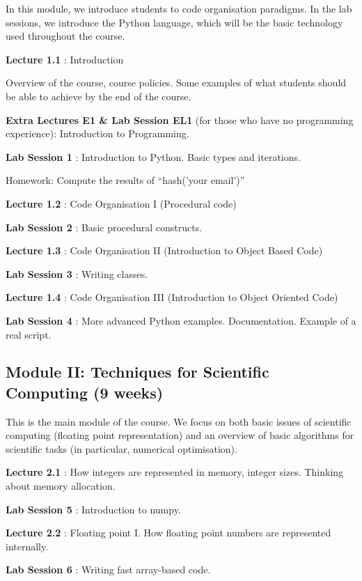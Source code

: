 \documentclass{article}
\newcommand*{\Lecture}[1]{%
{\bf #1}%
}
\begin{document}
In this module, we introduce students to code organisation paradigms. In the lab sessions, we introduce the Python language, which will be the basic technology used throughout the course.

\Lecture{Lecture 1.1}: Introduction

Overview of the course, course policies. Some examples of what students should be able to achieve by the end of the course.

\Lecture{Extra Lectures E1 \& Lab Session EL1} (for those who have no programming experience): Introduction to Programming.

\Lecture{Lab Session 1}: Introduction to Python. Basic types and iterations.

Homework: Compute the results of ``hash('your email')'' %

\Lecture{Lecture 1.2}: Code Organisation I (Procedural code)

\Lecture{Lab Session 2}: Basic procedural constructs.

\Lecture{Lecture 1.3}: Code Organisation II (Introduction to Object Based Code)

\Lecture{Lab Session 3}: Writing classes.

\Lecture{Lecture 1.4}: Code Organisation III (Introduction to Object Oriented Code)

\Lecture{Lab Session 4}: More advanced Python examples. Documentation. Example of a real script.

\subsection{Module II: Techniques for Scientific Computing (9 weeks)}

This is the main module of the course. We focus on both basic issues of scientific computing (floating point representation) and an overview of basic algorithms for scientific tasks (in particular, numerical optimisation).

\Lecture{Lecture 2.1}: How integers are represented in memory, integer sizes. Thinking about memory allocation.

\Lecture{Lab Session 5}: Introduction to numpy.

\Lecture{Lecture 2.2}:  Floating point I. How floating point numbers are represented internally.

\Lecture{Lab Session 6}: Writing fast array-based code.
\end{document}
